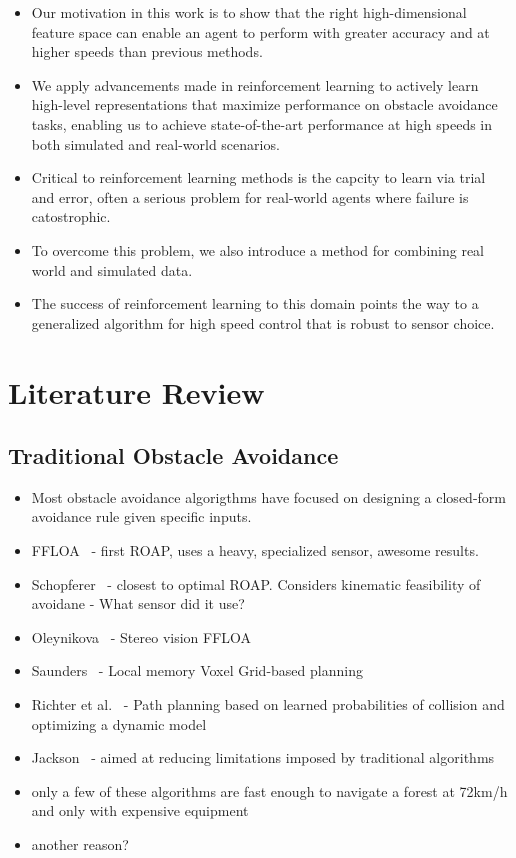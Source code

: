 \documentclass[paper=a4, fontsize=11pt]{scrartcl} %
\begin{document}
\begin{itemize}	
	\item Our motivation in this work is to show that the right high-dimensional feature space can enable an agent to perform with greater accuracy and at higher speeds than previous methods.
	\item We apply advancements made in reinforcement learning to actively learn high-level representations that maximize performance on obstacle avoidance tasks, enabling us to achieve state-of-the-art performance at high speeds in both simulated and real-world scenarios. 
\end{itemize}

\begin{itemize}
	\item Critical to reinforcement learning methods is the capcity to learn via trial and error, often a serious problem for real-world agents where failure is catostrophic.
	\item To overcome this problem, we also introduce a method for combining real world and simulated data.
	\item The success of reinforcement learning to this domain points the way to a generalized algorithm for high speed control that is robust to sensor choice.
\end{itemize}

\section{Literature Review}

	\subsection{Traditional Obstacle Avoidance}
	\begin{itemize}
		\item Most obstacle avoidance algorigthms have focused on designing a closed-form avoidance rule given specific inputs.
		\item FFLOA~\cite{Scherer2007} - first ROAP, uses a heavy, specialized sensor, awesome results.
		\item Schopferer~\cite{Schopferer2014} - closest to optimal ROAP.  Considers kinematic feasibility of avoidane - What sensor did it use?
		\item Oleynikova~\cite{Oleynikova2015} - Stereo vision FFLOA
		\item Saunders~\cite{Saunders2009} - Local memory Voxel Grid-based planning
		\item Richter et al.~\cite{Richter2014} - Path planning based on learned probabilities of collision and optimizing a dynamic model
		\item Jackson~\cite{CEPA} - aimed at reducing limitations imposed by traditional algorithms
		\item only a few of these algorithms are fast enough to navigate a forest at 72km/h and only with expensive equipment
		\item another reason?
	\end{itemize}
\end{document}
